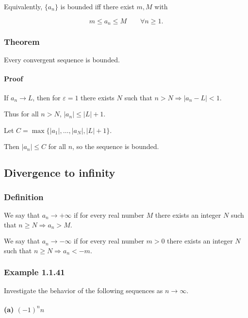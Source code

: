 \documentclass[11pt,a4paper]{article}
\begin{document}
Equivalently, \(\{a_n\}\) is bounded iff there exist \(m,M\) with

\[
m\le a_n\le M \qquad \forall n\ge1.
\]

\subsubsection{Theorem}\label{theorem}

Every convergent sequence is bounded.

\paragraph{Proof}\label{proof-2}

If \(a_n\to L\), then for \(\varepsilon=1\) there exists \(N\) such that
\(n>N \Rightarrow |a_n-L|<1.\)

Thus for all \(n>N\), \(|a_n|\le |L|+1.\)

Let \(C=\max\{|a_1|,\dots,|a_N|,|L|+1\}.\)

Then \(|a_n|\le C\) for all \(n\), so the sequence is bounded.

\subsection{Divergence to infinity}\label{divergence-to-infinity}

\subsubsection{Definition}\label{definition-1}

We say that \(a_n\to +\infty\) if for every real number \(M\) there
exists an integer \(N\) such that \(n\ge N \Rightarrow a_n>M.\)

We say that \(a_n\to -\infty\) if for every real number \(m>0\) there
exists an integer \(N\) such that \(n\ge N\Rightarrow a_n<-m.\)

\subsubsection{Example 1.1.41}\label{example-1.1.41}

Investigate the behavior of the following sequences as \(n\to\infty\).

\paragraph{\texorpdfstring{(a)
\((-1)^n n\)}{(a) (-1)\^{}n n}}\label{a--1n-n}
\end{document}
